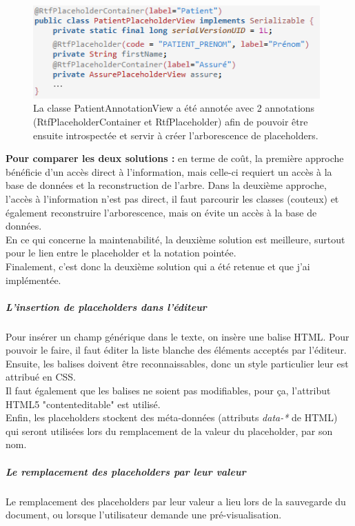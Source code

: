 \begin{figure}[H]
  \centering
  \includegraphics[width=11cm]{./img/annotations1}
  \caption{\label{fig:annotations} La classe PatientAnnotationView a été annotée avec 2 annotations (RtfPlaceholderContainer et RtfPlaceholder) afin de pouvoir être ensuite introspectée et servir à créer l'arborescence de placeholders.}
\end{figure}

\textbf{Pour comparer les deux solutions :} en terme de co\^ut, la première approche bénéficie d'un accès direct à l'information, mais celle-ci requiert un accès à la base de données et la reconstruction de l'arbre. Dans la deuxième approche, l'accès à l'information n'est pas direct, il faut parcourir les classes (couteux) et également reconstruire l'arborescence, mais on évite un accès à la base de données.\\
En ce qui concerne la maintenabilité, la deuxième solution est meilleure, surtout pour le lien entre le placeholder et la notation pointée.\\
Finalement, c'est donc la deuxième solution qui a été retenue et que j'ai implémentée.

\subparagraph*{L'insertion de placeholders dans l'éditeur}
Pour insérer un champ générique dans le texte, on insère une balise HTML. Pour pouvoir le faire, il faut éditer la liste blanche des éléments acceptés par l'éditeur. Ensuite, les balises doivent être reconnaissables, donc un style particulier leur est attribué en CSS.\\
Il faut également que les balises ne soient pas modifiables, pour ça, l'attribut HTML5 "contenteditable" est utilisé.\\
Enfin, les placeholders stockent des méta-données  (attributs \textit{data-*} de HTML) qui seront utilisées lors du remplacement de la valeur du placeholder, par son nom.

\subparagraph*{Le remplacement des placeholders par leur valeur}
Le remplacement des placeholders par leur valeur a lieu lors de la sauvegarde du document, ou lorsque l'utilisateur demande une pré-visualisation.\\

